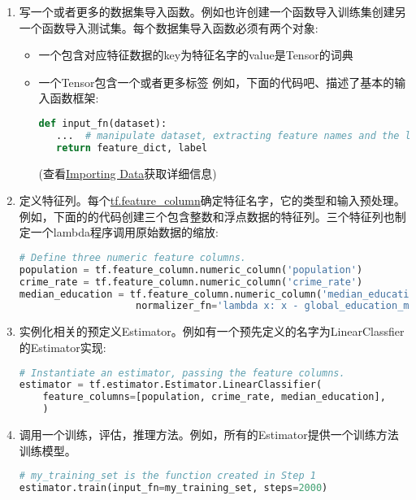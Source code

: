 \begin{enumerate}
\item 写一个或者更多的数据集导入函数。例如也许创建一个函数导入训练集创建另一个函数导入测试集。每个数据集导入函数必须有两个对象:
\begin{itemize}
\item 一个包含对应特征数据的key为特征名字的value是Tensor的词典
\item 一个Tensor包含一个或者更多标签\newline
例如，下面的代码吧、描述了基本的输入函数框架:
\begin{lstlisting}[language=Python]
def input_fn(dataset):
   ...  # manipulate dataset, extracting feature names and the label
   return feature_dict, label
\end{lstlisting}
(查看\href{https://www.tensorflow.org/programmers_guide/datasets?hl=zh-cn}{Importing Data}获取详细信息)
\end{itemize}
\item 定义特征列。每个\href{https://www.tensorflow.org/api_docs/python/tf/feature_column?hl=zh-cn}{tf.feature\_column}确定特征名字，它的类型和输入预处理。例如，下面的的代码创建三个包含整数和浮点数据的特征列。三个特征列也制定一个lambda程序调用原始数据的缩放:\newline
\begin{lstlisting}[language=Python]
# Define three numeric feature columns.
population = tf.feature_column.numeric_column('population')
crime_rate = tf.feature_column.numeric_column('crime_rate')
median_education = tf.feature_column.numeric_column('median_education',
                    normalizer_fn='lambda x: x - global_education_mean')
\end{lstlisting}
\item 实例化相关的预定义Estimator。例如有一个预先定义的名字为LinearClassfier 的Estimator实现:
\begin{lstlisting}[language=Python]
# Instantiate an estimator, passing the feature columns.
estimator = tf.estimator.Estimator.LinearClassifier(
    feature_columns=[population, crime_rate, median_education],
    )
\end{lstlisting}

\item 调用一个训练，评估，推理方法。例如，所有的Estimator提供一个训练方法训练模型。\newline
\begin{lstlisting}[language=Python]
# my_training_set is the function created in Step 1
estimator.train(input_fn=my_training_set, steps=2000)
\end{lstlisting}
\end{enumerate}
